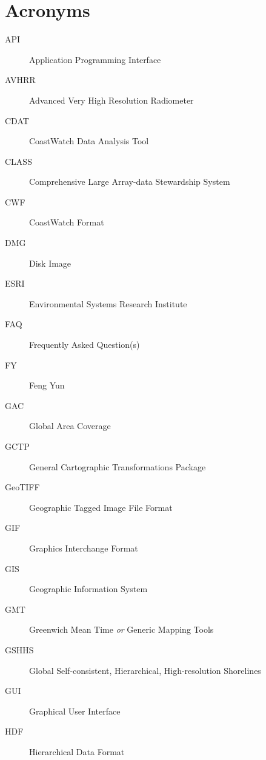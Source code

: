 \chapter{Acronyms}

\begin{description}

  \item[API] Application Programming Interface

  \item[AVHRR] Advanced Very High Resolution Radiometer

  \item[CDAT] CoastWatch Data Analysis Tool

  \item[CLASS] Comprehensive Large Array-data Stewardship System

  \item[CWF] CoastWatch Format

  \item[DMG] Disk Image

  \item[ESRI] Environmental Systems Research Institute

  \item[FAQ] Frequently Asked Question(s)

  \item[FY] Feng Yun

  \item[GAC] Global Area Coverage

  \item[GCTP] General Cartographic Transformations Package

  \item[GeoTIFF] Geographic Tagged Image File Format

  \item[GIF] Graphics Interchange Format

  \item[GIS] Geographic Information System

  \item[GMT] Greenwich Mean Time {\em or} Generic Mapping Tools

  \item[GSHHS] Global Self-consistent, Hierarchical,
  High-resolution Shorelines

  \item[GUI] Graphical User Interface

  \item[HDF] Hierarchical Data Format


\end{description}
